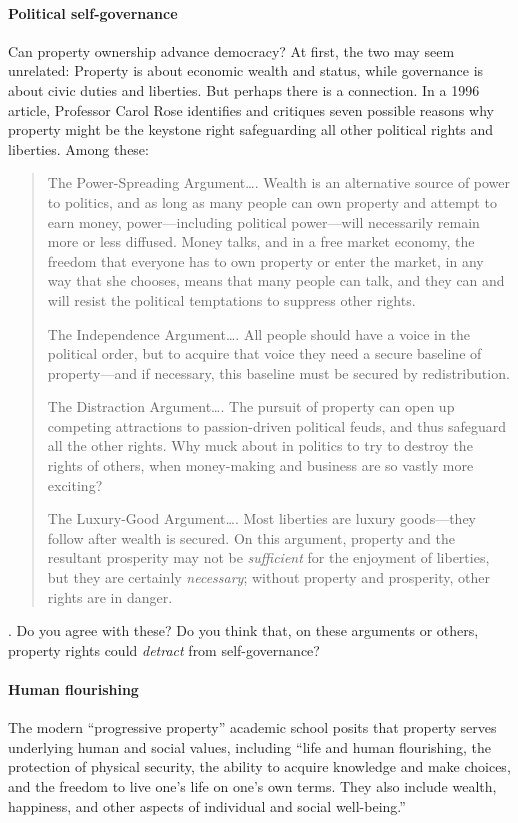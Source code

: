 \paragraph{Political self-governance}
Can property ownership advance democracy? At first, the two may seem unrelated:
Property is about economic wealth and status, while governance is about civic
duties and liberties. But perhaps there is a connection. In a 1996 article,
Professor Carol Rose identifies and critiques seven possible reasons why
property might be the keystone right safeguarding all other political rights and
liberties. Among these:
\begin{quotation}
The Power-Spreading Argument\ldots. Wealth is an alternative source of power
to politics, and as long as many people can own property and attempt to earn
money, power---including political power---will necessarily remain more or less
diffused. Money talks, and in a free market economy, the freedom that everyone
has to own property or enter the market, in any way that she chooses, means that
many people can talk, and they can and will resist the political temptations to
suppress other rights.

The Independence Argument\ldots. All people should have a voice in the
political order, but to acquire that voice they need a secure baseline of
property---and if necessary, this baseline must be secured by redistribution.

The Distraction Argument\ldots. The pursuit of property can open up competing
attractions to passion-driven political feuds, and thus safeguard all the other
rights. Why muck about in politics to try to destroy the rights of others, when
money-making and business are so vastly more exciting?

The Luxury-Good Argument\ldots. Most liberties are luxury goods---they follow
after wealth is secured. On this argument, property and the resultant prosperity
may not be \emph{sufficient} for the enjoyment of liberties, but they are
certainly \emph{necessary}; without property and prosperity, other rights are in
danger.
\end{quotation}
. Do you agree with these? Do you think that, on these
arguments or others, property rights could \emph{detract} from self-governance?


\paragraph{Human flourishing}
The modern ``progressive property'' academic school posits that property serves
underlying human and social values, including ``life and human flourishing, the
protection of physical security, the ability to acquire knowledge and make
choices, and the freedom to live one's life on one's own terms. They also
include wealth, happiness, and other aspects of individual and social
well-being.''

